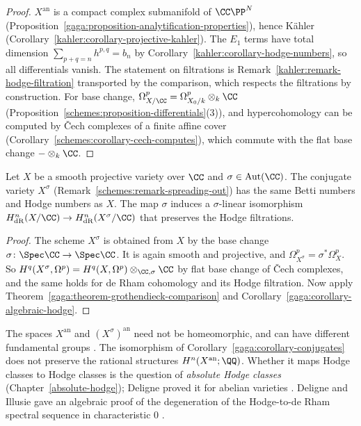 \begin{proof}
$X^{\mathrm{an}}$ is a compact complex submanifold of $\CC\PP^N$ (Proposition~\ref{gaga:proposition-analytification-properties}), hence K\"ahler
(Corollary~\ref{kahler:corollary-projective-kahler}). The $E_1$ terms have total dimension $\sum_{p+q=n}h^{p,q} = b_n$ by
Corollary~\ref{kahler:corollary-hodge-numbers}, so all differentials vanish. The statement on filtrations is Remark~\ref{kahler:remark-hodge-filtration}
transported by the comparison, which respects the filtrations by construction. For base change, $\Omega^p_{X/\CC} = \Omega^p_{X_0/k} \otimes_k\CC$
(Proposition~\ref{schemes:proposition-differentials}(3)), and hypercohomology can be computed by \v{C}ech complexes of a finite affine cover
(Corollary~\ref{schemes:corollary-cech-computes}), which commute with the flat base change $- \otimes_k\CC$.
\end{proof}

\begin{corollary}\label{gaga:corollary-conjugates}
Let $X$ be a smooth projective variety over $\CC$ and $\sigma \in \mathrm{Aut}(\CC)$. The conjugate variety $X^\sigma$ (Remark~\ref{schemes:remark-spreading-out}) has the same
Betti numbers and Hodge numbers as $X$. The map $\sigma$ induces a $\sigma$-linear isomorphism $H^n_{\mathrm{dR}}(X/\CC) \to H^n_{\mathrm{dR}}(X^\sigma/\CC)$ that preserves the
Hodge filtrations.
\end{corollary}

\begin{proof}
The scheme $X^\sigma$ is obtained from $X$ by the base change $\sigma \colon \Spec\CC \to \Spec\CC$. It is again smooth and projective, and $\Omega^p_{X^\sigma} = \sigma^*\Omega^p_X$. So
$H^q(X^\sigma, \Omega^p) = H^q(X, \Omega^p) \otimes_{\CC,\sigma}\CC$ by flat base change of \v{C}ech complexes, and the same holds for de Rham cohomology and its Hodge
filtration. Now apply Theorem~\ref{gaga:theorem-grothendieck-comparison} and Corollary~\ref{gaga:corollary-algebraic-hodge}.
\end{proof}

\begin{remark}\label{gaga:remark-conjugates-not-homeomorphic}
The spaces $X^{\mathrm{an}}$ and $(X^\sigma)^{\mathrm{an}}$ need not be homeomorphic, and can have different fundamental groups \cite{serre-1964}. The isomorphism of
Corollary~\ref{gaga:corollary-conjugates} does not preserve the rational structures $H^n(X^{\mathrm{an}}; \QQ)$. Whether it maps Hodge classes to Hodge classes is the question of
\emph{absolute Hodge classes} (Chapter~\ref{absolute-hodge}); Deligne proved it for abelian varieties \cite{deligne-abelian}. Deligne and Illusie gave an algebraic proof of the degeneration of the
Hodge-to-de Rham spectral sequence in characteristic $0$ \cite{deligne-illusie}.
\end{remark}

